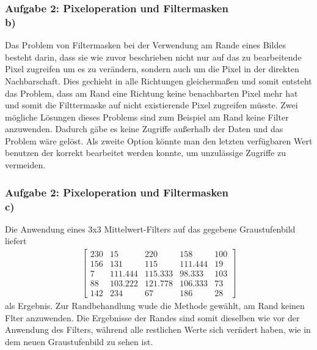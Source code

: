 \documentclass[accentcolor=tud9c,colorbacktitle,inverttitle,landscape,german,presentation,t]{tudbeamer}
\begin{document}
	\begin{frame}
		\frametitle{Aufgabe 2: Pixeloperation und Filtermasken \\ b)}
		Das Problem von Filtermasken bei der Verwendung am Rande eines Bildes besteht darin, dass sie wie zuvor beschrieben nicht nur auf das zu bearbeitende Pixel zugreifen um es  zu ver\"andern, sondern auch um die Pixel in der direkten Nachbarschaft. Dies gechieht in alle Richtungen gleicherma\ss en und somit entsteht das Problem, dass am Rand eine Richtung keine benachbarten Pixel mehr hat und somit die Filttermaske auf nicht existierende Pixel zugreifen m\"usste. Zwei m\"ogliche L\"osungen dieses Problems sind zum Beispiel am Rand keine Filter anzuwenden. Dadurch g\"abe es keine Zugriffe au\ss erhalb der Daten und das Problem w\"are gel\"ost. Als zweite Option k\"onnte man den letzten verf\"ugbaren Wert benutzen der korrekt bearbeitet werden konnte, um unzul\"assige Zugriffe zu vermeiden. 
	\end{frame}
	
	\begin{frame}
		\frametitle{Aufgabe 2: Pixeloperation und Filtermasken \\ c)}
	
		Die Anwendung eines 3x3 Mittelwert-Filters auf das gegebene Graustufenbild liefert
		\begin{align*}
		\begin{bmatrix}
		230 & 15 & 220 & 158 & 100 \\
		156 & 131 & 115 & 111.444 & 19\\
		7 & 111.444 & 115.333 & 98.333 & 103\\
		88 & 103.222 & 121.778 & 106.333 & 73\\
		142 &234 & 67 & 186 & 28
		\end{bmatrix}
		\end{align*}
		als Ergebnis. Zur Randbehandlung wude die Methode gew\"ahlt, am Rand keinen Flter anzuwenden. Die Ergebnisse der Randes sind somit dieselben wie vor der Anwendung des Filters, w\"ahrend alle restlichen Werte sich ver\"ndert haben, wie in dem neuen Graustufenbild zu sehen ist.
	\end{frame}
\end{document}
